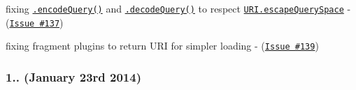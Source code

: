\begin{DoxyItemize}
\item fixing \href{http://medialize.github.io/URI.js/docs.html#static-encodeQuery}{\tt {\ttfamily .encode\+Query()}} and \href{http://medialize.github.io/URI.js/docs.html#static-decodeQuery}{\tt {\ttfamily .decode\+Query()}} to respect \href{http://medialize.github.io/URI.js/docs.html#setting-escapeQuerySpace}{\tt {\ttfamily U\+R\+I.\+escape\+Query\+Space}} -\/ (\href{https://github.com/medialize/URI.js/issues/137}{\tt Issue \#137})
\item fixing fragment plugins to return U\+RI for simpler loading -\/ (\href{https://github.com/medialize/URI.js/issues/139}{\tt Issue \#139})
\end{DoxyItemize}

\subsubsection*{1.. (January 23rd 2014)}


